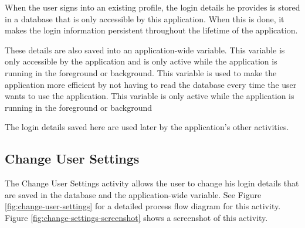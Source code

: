 When the user signs into an existing profile, the login details he provides
is stored in a database that is only accessible by this application. When this is done, it
makes the login information persistent throughout the lifetime of the application.

These details are also saved into an application-wide variable. This variable is
only accessible by the application and is only active while the application is running in
the foreground or background. This variable is used to make the application more
efficient by not having to read the database every time the user wants to use
the application. This variable is only active while the application is running in the foreground
or background

The login details saved here are used later by the application's other activities.

\subsection{Change User Settings}

The Change User Settings activity allows the user to change his login
details that are saved in the database and the application-wide variable. See Figure
\ref{fig:change-user-settings} for a detailed process flow diagram for this
activity. Figure \ref{fig:change-settings-screenshot} shows a screenshot of this
activity.

